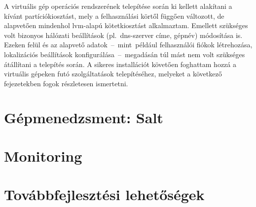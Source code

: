 A virtuális gép operációs rendszerének telepítése során ki kellett alakítani a kívánt partíciókiosztást, mely a felhasználási körtől függően változott, de alapvetően mindenhol \acrshort{lvm}-alapú kötetkiosztást alkalmaztam. Emellett szükséges volt bizonyos hálózati beállítások (pl.~\acrshort{dns}-szerver címe, gépnév) módosítása is. Ezeken felül és az alapvető adatok~--~mint~például felhasználói fiókok létrehozása, lokalizációs beállítások konfigurálása~--~megadásán túl mást nem volt szükséges átállítani a telepítés során. A sikeres installációt követően foghattam hozzá a virtuális gépeken futó szolgáltatások telepítéséhez, melyeket a következő fejezetekben fogok részletesen ismertetni.

\section{Gépmenedzsment: Salt}


\section{Monitoring}

\section{Továbbfejlesztési lehetőségek}